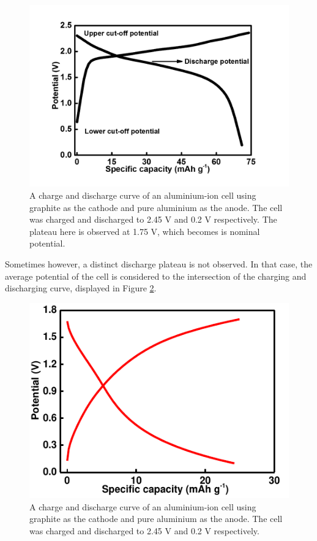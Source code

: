\begin{itemize}
\begin{figure}[tbh!]
\centering
\includegraphics[width=\textwidth]{Figures/chap1fig/CDCforcellvoltage}
\caption{A charge and discharge curve of an aluminium-ion cell using graphite as the cathode and pure aluminium as the anode. The cell was charged and discharged to 2.45 V and 0.2 V respectively. The plateau here is observed at 1.75 V, which becomes is nominal potential.}
\label{Figures/chap1fig:CDCforcellvoltage}
\end{figure}

Sometimes however, a distinct discharge plateau is not observed. In that case, the average potential of the cell is considered to the intersection of the charging and discharging curve, displayed in Figure \ref{Figures/chap1fig:batpot}. 

\begin{figure}[tbh!]
\centering
\includegraphics[width=\textwidth]{Figures/chap1fig/batpot.pdf}
\caption{A charge and discharge curve of an aluminium-ion cell using graphite as the cathode and pure aluminium as the anode. The cell was charged and discharged to 2.45 V and 0.2 V respectively.}
\label{Figures/chap1fig:batpot}
\end{figure}


\end{itemize}
